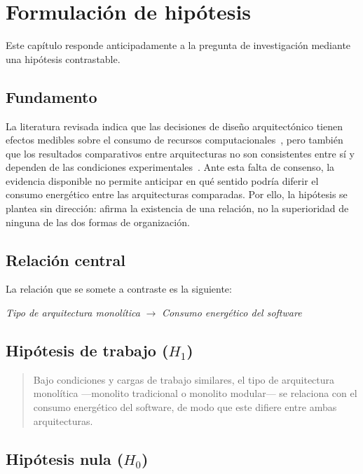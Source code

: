 \chapter{Formulación de hipótesis}
\label{cap:hipotesis}

Este capítulo responde anticipadamente a la pregunta de investigación mediante una hipótesis contrastable.

\section{Fundamento}

La literatura revisada indica que las decisiones de diseño arquitectónico tienen efectos medibles sobre el consumo de recursos computacionales~\cite{jagroep2017extending,seo2008framework}, pero también que los resultados comparativos entre arquitecturas no son consistentes entre sí y dependen de las condiciones experimentales~\cite{araujo2024energy}. Ante esta falta de consenso, la evidencia disponible no permite anticipar en qué sentido podría diferir el consumo energético entre las arquitecturas comparadas. Por ello, la hipótesis se plantea sin dirección: afirma la existencia de una relación, no la superioridad de ninguna de las dos formas de organización.

\section{Relación central}

La relación que se somete a contraste es la siguiente:

\begin{center}
\textit{Tipo de arquitectura monolítica} $\longrightarrow$ \textit{Consumo energético del software}
\end{center}

\section{Hipótesis de trabajo (\texorpdfstring{$H_1$}{H1})}

\begin{quote}
Bajo condiciones y cargas de trabajo similares, el tipo de arquitectura monolítica ---monolito tradicional o monolito modular--- se relaciona con el consumo energético del software, de modo que este difiere entre ambas arquitecturas.
\end{quote}

\section{Hipótesis nula (\texorpdfstring{$H_0$}{H0})}

